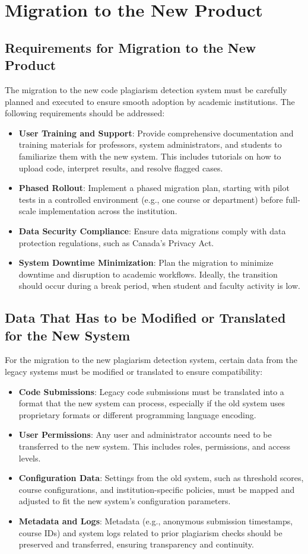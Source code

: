 \documentclass[12pt]{article}
\begin{document}
\section{Migration to the New Product}
\subsection{Requirements for Migration to the New Product}
The migration to the new code plagiarism detection system must be carefully planned and executed to ensure smooth adoption by academic institutions. The following requirements should be addressed:
\begin{itemize}
    \item \textbf{User Training and Support}: Provide comprehensive documentation and training materials for professors, system administrators, and students to familiarize them with the new system. This includes tutorials on how to upload code, interpret results, and resolve flagged cases.
    \item \textbf{Phased Rollout}: Implement a phased migration plan, starting with pilot tests in a controlled environment (e.g., one course or department) before full-scale implementation across the institution.
    \item \textbf{Data Security Compliance}: Ensure data migrations comply with data protection regulations, such as Canada's Privacy Act.
    \item \textbf{System Downtime Minimization}: Plan the migration to minimize downtime and disruption to academic workflows. Ideally, the transition should occur during a break period, when student and faculty activity is low.
\end{itemize}
\subsection{Data That Has to be Modified or Translated for the New System}
For the migration to the new plagiarism detection system, certain data from the legacy systems must be modified or translated to ensure compatibility:
\begin{itemize}
    \item \textbf{Code Submissions}: Legacy code submissions must be translated into a format that the new system can process, especially if the old system uses proprietary formats or different programming language encoding.
    \item \textbf{User Permissions}: Any user and administrator accounts need to be transferred to the new system. This includes roles, permissions, and access levels.
    \item \textbf{Configuration Data}: Settings from the old system, such as threshold scores, course configurations, and institution-specific policies, must be mapped and adjusted to fit the new system’s configuration parameters.
    \item \textbf{Metadata and Logs}: Metadata (e.g., anonymous submission timestamps, course IDs) and system logs related to prior plagiarism checks should be preserved and transferred, ensuring transparency and continuity.
\end{itemize}
\end{document}
